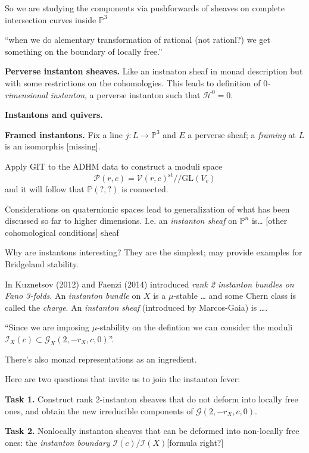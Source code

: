 So we are studying the components via pushforwards of sheaves on complete
intersection curves inside $\mathbb{P}^3$ 

``when we do alementary transformation of rational (not rationl?) we get
something on the boundary of locally free.''

\medskip\noindent
{\bf Perverse instanton sheaves.} Like an instnaton sheaf in monad description
but with some restrictions on the cohomologies. This leads to definition of {\it
$0$-rimensional instanton}, a perverse instanton such that $\mathcal{H}^0=0$.

\medskip\noindent
{\bf Instantons and quivers.}

\medskip\noindent
{\bf Framed instantons.} Fix a line $j:L\to \mathbb{P}^3$ and $E$ a perverse
sheaf; a {\it framing} at $L$ is an isomorphis [missing].

Apply GIT to the ADHM data to construct a moduli space 
$$
\mathcal{P}(r,c)=\mathcal{V}(r,c)^{\text{st}}/\!/\text{GL}(V_c)
$$
and it will follow that $\mathbb{P}(?,?)$ is connected.

\medskip\noindent
Considerations on quaternionic spaces lead to generalization of what has been
discussed so far to higher dimensions. I.e. an {\it instanton sheaf} on
$\mathbb{P}^n$ is… [other cohomological conditions]
sheaf

Why are instantons interesting? They are the simplest; may provide examples for
Bridgeland stability.

In Kuznetsov (2012) and Faenzi (2014) introduced {\it rank 2 instanton bundles
on Fano 3-folds}. An {\it instanton bundle} on $X$ is a $\mu$-stable … and some
Chern class is called the {\it charge}. An {\it
instanton sheaf} (introduced by Marcos-Gaia) is ….

 ``Since we are imposing $\mu$-stability on the defintion we can consider the
moduli $\mathcal{I}_X(c) \subset \mathcal{G}_X(2,-r_X,c,0)$''.

There's also monad representations as an ingredient.


\medskip\noindent
Here are two questions that invite us to join the instanton fever:

\medskip\noindent
{\bf Task 1.} Construct rank 2-instanton sheaves that do not deform into locally
free ones, and obtain the new irreducible components of
$\mathcal{G}(2,-r_X,c,0)$.

\medskip\noindent
{\bf Task 2.} Nonlocally instanton sheaves that can be deformed into non-locally
free ones: the {\it instanton boundary}
$\overline{\mathcal{I}(c)}/\mathcal{I}(X)$[formula right?]


